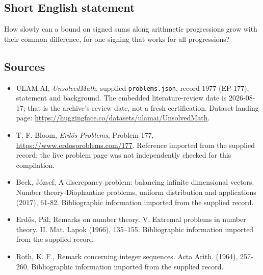 \documentclass[11pt,a4paper]{article}
\begin{document}
\subsection{Short English statement}

How slowly can a bound on signed sums along arithmetic progressions grow with their common difference, for one signing that works for all progressions?

\subsection{Sources}

{\small

\begin{itemize}

\item[\hypertarget{source:1977:1}{S1}] ULAM.AI, \emph{UnsolvedMath}, supplied \texttt{problems.json}, record 1977 (EP-177), statement and background. The embedded literature-review date is 2026-08-17; that is the archive’s review date, not a fresh certification. Dataset landing page: \url{https://huggingface.co/datasets/ulamai/UnsolvedMath}.

\item[\hypertarget{source:1977:2}{S2}] T. F. Bloom, \emph{Erdős Problems}, Problem 177, \url{https://www.erdosproblems.com/177}. Reference imported from the supplied record; the live problem page was not independently checked for this compilation.

\item[\hypertarget{source:1977:3}{S3}] Beck, J\'{o}zsef, A discrepancy problem: balancing infinite dimensional vectors. Number theory-Diophantine problems, uniform distribution and applications (2017), 61-82. Bibliographic information imported from the supplied record.

\item[\hypertarget{source:1977:4}{S4}] Erd\H{o}s, P\'al, Remarks on number theory. {V}. {E}xtremal problems in number theory. {II}. Mat. Lapok (1966), 135--155. Bibliographic information imported from the supplied record.

\item[\hypertarget{source:1977:5}{S5}] Roth, K. F., Remark concerning integer sequences. Acta Arith. (1964), 257-260. Bibliographic information imported from the supplied record.

\end{itemize}

}

\label{end:1977}
\end{document}
